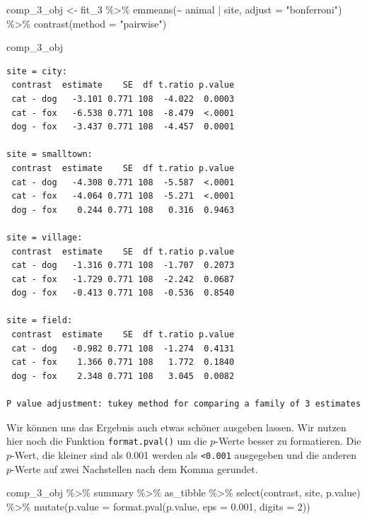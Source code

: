 \documentclass[
  letterpaper,
]{scrbook}
\newenvironment{Shaded}{\begin{snugshade}}{\end{snugshade}}
\newcommand{\AttributeTok}[1]{\textcolor[rgb]{0.40,0.45,0.13}{#1}}
\newcommand{\DecValTok}[1]{\textcolor[rgb]{0.68,0.00,0.00}{#1}}
\newcommand{\FloatTok}[1]{\textcolor[rgb]{0.68,0.00,0.00}{#1}}
\newcommand{\FunctionTok}[1]{\textcolor[rgb]{0.28,0.35,0.67}{#1}}
\newcommand{\NormalTok}[1]{\textcolor[rgb]{0.00,0.23,0.31}{#1}}
\newcommand{\OtherTok}[1]{\textcolor[rgb]{0.00,0.23,0.31}{#1}}
\newcommand{\SpecialCharTok}[1]{\textcolor[rgb]{0.37,0.37,0.37}{#1}}
\newcommand{\StringTok}[1]{\textcolor[rgb]{0.13,0.47,0.30}{#1}}
\begin{document}
\begin{Shaded}
\begin{Highlighting}[]
\NormalTok{comp\_3\_obj }\OtherTok{\textless{}{-}}\NormalTok{ fit\_3 }\SpecialCharTok{\%\textgreater{}\%} 
  \FunctionTok{emmeans}\NormalTok{(}\SpecialCharTok{\textasciitilde{}}\NormalTok{ animal }\SpecialCharTok{|}\NormalTok{ site, }\AttributeTok{adjust =} \StringTok{"bonferroni"}\NormalTok{) }\SpecialCharTok{\%\textgreater{}\%} 
  \FunctionTok{contrast}\NormalTok{(}\AttributeTok{method =} \StringTok{"pairwise"}\NormalTok{) }

\NormalTok{comp\_3\_obj}
\end{Highlighting}
\end{Shaded}

\begin{verbatim}
site = city:
 contrast  estimate    SE  df t.ratio p.value
 cat - dog   -3.101 0.771 108  -4.022  0.0003
 cat - fox   -6.538 0.771 108  -8.479  <.0001
 dog - fox   -3.437 0.771 108  -4.457  0.0001

site = smalltown:
 contrast  estimate    SE  df t.ratio p.value
 cat - dog   -4.308 0.771 108  -5.587  <.0001
 cat - fox   -4.064 0.771 108  -5.271  <.0001
 dog - fox    0.244 0.771 108   0.316  0.9463

site = village:
 contrast  estimate    SE  df t.ratio p.value
 cat - dog   -1.316 0.771 108  -1.707  0.2073
 cat - fox   -1.729 0.771 108  -2.242  0.0687
 dog - fox   -0.413 0.771 108  -0.536  0.8540

site = field:
 contrast  estimate    SE  df t.ratio p.value
 cat - dog   -0.982 0.771 108  -1.274  0.4131
 cat - fox    1.366 0.771 108   1.772  0.1840
 dog - fox    2.348 0.771 108   3.045  0.0082

P value adjustment: tukey method for comparing a family of 3 estimates 
\end{verbatim}

Wir können uns das Ergebnis auch etwas schöner ausgeben lassen. Wir
nutzen hier noch die Funktion \texttt{format.pval()} um die \(p\)-Werte
besser zu formatieren. Die \(p\)-Wert, die kleiner sind als 0.001 werden
als \texttt{\textless{}0.001} ausgegeben und die anderen \(p\)-Werte auf
zwei Nachstellen nach dem Komma gerundet.

\begin{Shaded}
\begin{Highlighting}[]
\NormalTok{comp\_3\_obj }\SpecialCharTok{\%\textgreater{}\%} 
\NormalTok{  summary }\SpecialCharTok{\%\textgreater{}\%} 
\NormalTok{  as\_tibble }\SpecialCharTok{\%\textgreater{}\%} 
  \FunctionTok{select}\NormalTok{(contrast, site, p.value) }\SpecialCharTok{\%\textgreater{}\%} 
  \FunctionTok{mutate}\NormalTok{(}\AttributeTok{p.value =} \FunctionTok{format.pval}\NormalTok{(p.value, }\AttributeTok{eps =} \FloatTok{0.001}\NormalTok{, }\AttributeTok{digits =} \DecValTok{2}\NormalTok{))}
\end{Highlighting}
\end{Shaded}
\end{document}
